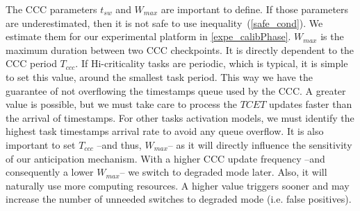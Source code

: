 \documentclass[french, a4paper, 11pt, twoside, pdftex]{StyleThese}
\begin{document}
        
            The CCC parameters $t_{sw}$ and $W_{max}$ are important to define. If those parameters are underestimated, then it is not safe to use inequality~(\ref{safe_cond}). We estimate them for our experimental platform in \ref{expe_calibPhase}. 
            $W_{max}$ is the maximum duration between two CCC checkpoints. It is directly dependent to the CCC period $T_{ccc}$. If Hi-criticality tasks are periodic, which is typical, it is simple to set this value, around the smallest task period. This way we have the guarantee of not overflowing the timestamps queue used by the CCC. A greater value is possible, but we must take care to process the $TCET$ updates faster than the arrival of timestamps. For other tasks activation models, we must identify the highest task timestamps arrival rate to avoid any queue overflow. 
            It is also important to set $T_{ccc}$ --and thus, $W_{max}$-- as it will directly influence the sensitivity of our anticipation mechanism. With a higher CCC update frequency --and consequently a lower $W_{max}$-- we switch to degraded mode later. Also, it will naturally use more computing resources. A higher value triggers sooner and may increase the number of unneeded switches to degraded mode (i.e. false positives). 
\end{document}
